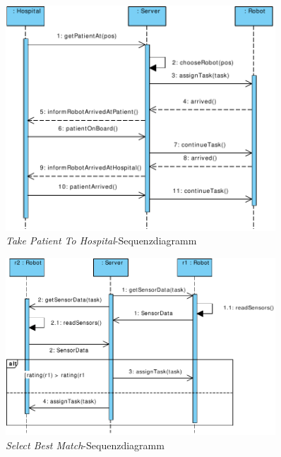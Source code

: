 \begin{figure}[H]
	\centering
	\includegraphics[width=0.9\textwidth]{img/1-Analyse-2-TakePatientToHospital}
	\caption{\emph{Take Patient To Hospital}-Sequenzdiagramm}
	\label{SequenzDiagrammInteraktion}
\end{figure}



\begin{figure}[H]
	\centering
	\includegraphics[width=0.9\textwidth]{img/0-Entwurf-2-ChooseRob}
	\caption{\emph{Select Best Match}-Sequenzdiagramm}
	\label{SequenzDiagrammInteraktion}
\end{figure}
